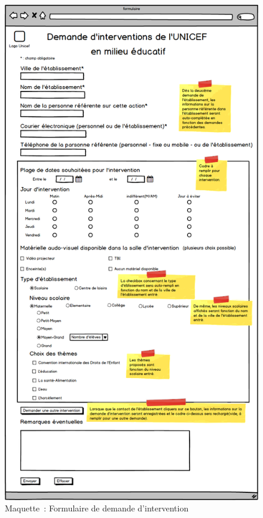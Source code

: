 \begin{figure}[H]
	\centering
	\includegraphics[scale=0.415]{images/maquettes/fonctionnalite3FormulaireDeDemandeDInterventions.png}
	\caption{Maquette~: Formulaire de demande d'intervention}
	\label{fonctionnalite3FormulaireDeDemandeDInterventions}
\end{figure}


